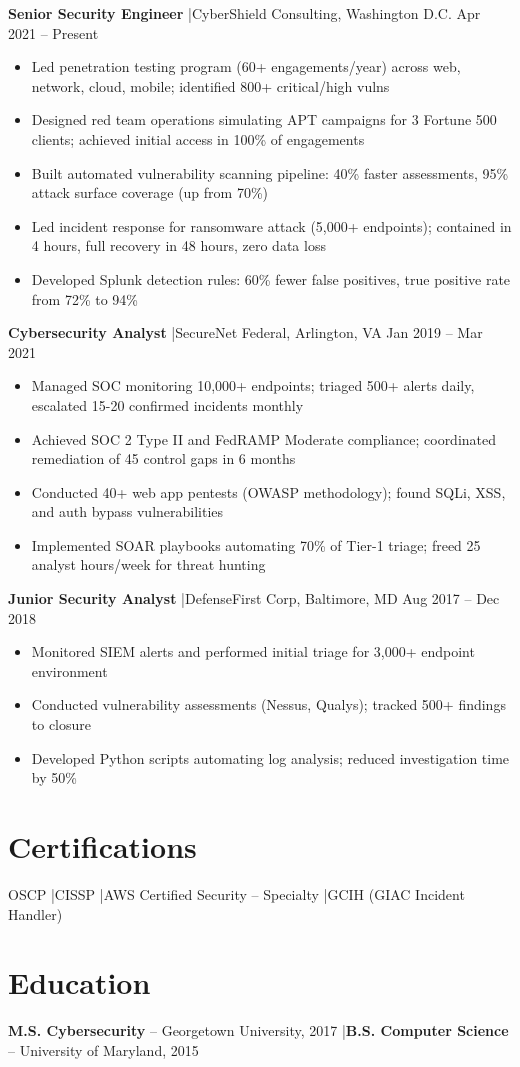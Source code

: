 \documentclass[9.5pt,a4paper]{article}
\begin{document}
\textbf{Senior Security Engineer} \quad|\quad CyberShield Consulting, Washington D.C. \hfill Apr 2021 -- Present
\begin{itemize}
  \item Led penetration testing program (60+ engagements/year) across web, network, cloud, mobile; identified 800+ critical/high vulns
  \item Designed red team operations simulating APT campaigns for 3 Fortune 500 clients; achieved initial access in 100\% of engagements
  \item Built automated vulnerability scanning pipeline: 40\% faster assessments, 95\% attack surface coverage (up from 70\%)
  \item Led incident response for ransomware attack (5,000+ endpoints); contained in 4 hours, full recovery in 48 hours, zero data loss
  \item Developed Splunk detection rules: 60\% fewer false positives, true positive rate from 72\% to 94\%
\end{itemize}

\textbf{Cybersecurity Analyst} \quad|\quad SecureNet Federal, Arlington, VA \hfill Jan 2019 -- Mar 2021
\begin{itemize}
  \item Managed SOC monitoring 10,000+ endpoints; triaged 500+ alerts daily, escalated 15-20 confirmed incidents monthly
  \item Achieved SOC 2 Type II and FedRAMP Moderate compliance; coordinated remediation of 45 control gaps in 6 months
  \item Conducted 40+ web app pentests (OWASP methodology); found SQLi, XSS, and auth bypass vulnerabilities
  \item Implemented SOAR playbooks automating 70\% of Tier-1 triage; freed 25 analyst hours/week for threat hunting
\end{itemize}

\textbf{Junior Security Analyst} \quad|\quad DefenseFirst Corp, Baltimore, MD \hfill Aug 2017 -- Dec 2018
\begin{itemize}
  \item Monitored SIEM alerts and performed initial triage for 3,000+ endpoint environment
  \item Conducted vulnerability assessments (Nessus, Qualys); tracked 500+ findings to closure
  \item Developed Python scripts automating log analysis; reduced investigation time by 50\%
\end{itemize}

\section{Certifications}
OSCP \quad|\quad CISSP \quad|\quad AWS Certified Security -- Specialty \quad|\quad GCIH (GIAC Incident Handler)

\section{Education}
\textbf{M.S. Cybersecurity} -- Georgetown University, 2017 \quad|\quad \textbf{B.S. Computer Science} -- University of Maryland, 2015
\end{document}
